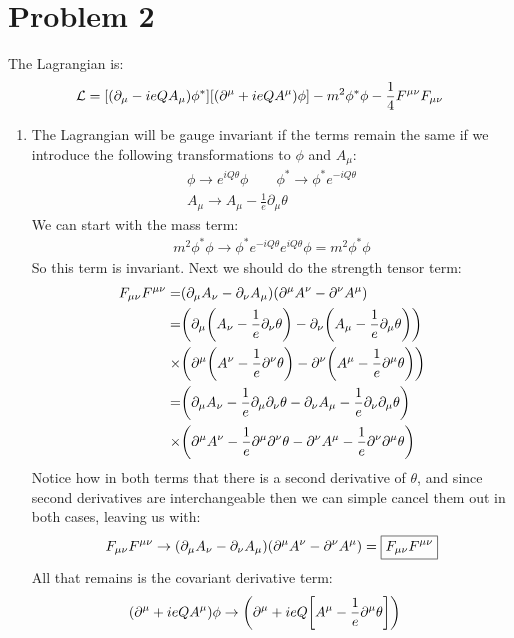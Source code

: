 \documentclass[12pt]{article}
\renewcommand{\L}{\mathcal{L}}
\newcommand{\D}{\partial}
\newcommand{\munu}{{\mu\nu}}
\begin{document}
\section*{Problem 2}
The Lagrangian is:
\begin{align*}
  \L=\qty[(\D_\mu-ieQA_\mu)\phi^*]\qty[(\D^\mu+ieQA^\mu)\phi]
  -m^2\phi^*\phi-\frac{1}{4}F^\munu F_\munu
\end{align*}
\begin{enumerate}[label=\alph*)]
\item The Lagrangian will be gauge invariant if the terms remain the same if we introduce the following transformations to $\phi$ and $A_\mu$:
  \begin{gather*}
    \phi\to e^{iQ\theta}\phi\qquad\phi^*\to \phi^*e^{-iQ\theta} \\
    A_\mu\to A_\mu-\frac{1}{e}\D_\mu\theta
  \end{gather*}
  We can start with the mass term:
  \begin{align*}
    m^2\phi^*\phi\to\phi^*e^{-iQ\theta}e^{iQ\theta}\phi=\boxed{m^2\phi^*\phi}
  \end{align*}
  So this term is invariant. Next we should do the strength tensor term:
  \begin{align*}
    F_{\mu\nu}F^{\mu\nu}=& (\D_\mu A_\nu-\D_\nu A_\mu)(\D^\mu A^\nu-\D^\nu A^\mu)\\
    =& \qty(\D_\mu\qty(A_\nu-\frac{1}{e}\D_\nu\theta)
    -\D_\nu\qty(A_\mu-\frac{1}{e}\D_\mu\theta))\\
    \times& \qty(\D^\mu\qty(A^\nu-\frac{1}{e}\D^\nu\theta)
    -\D^\nu\qty(A^\mu-\frac{1}{e}\D^\mu\theta))\\
    =& \qty(\D_\mu A_\nu-\frac{1}{e}\D_\mu\D_\nu\theta
    -\D_\nu A_\mu-\frac{1}{e}\D_\nu\D_\mu\theta)\\
    \times& \qty(\D^\mu A^\nu-\frac{1}{e}\D^\mu\D^\nu\theta
    -\D^\nu A^\mu-\frac{1}{e}\D^\nu\D^\mu\theta)
  \end{align*}
  Notice how in both terms that there is a second derivative of $\theta$, and since second derivatives are interchangeable then we can simple cancel them out in both cases, leaving us with:
  \begin{align*}
    F_{\mu\nu}F^{\mu\nu}\to\qty(\D_\mu A_\nu-\D_\nu A_\mu)
    \qty(\D^\mu A^\nu-\D^\nu A^\mu)=\boxed{F_{\mu\nu}F^{\mu\nu}}
  \end{align*}
  All that remains is the covariant derivative term:
  \begin{align*}
    (\D^\mu+ieQA^\mu)\phi&\to\qty(\D^\mu+ieQ\qty[A^\mu-\frac{1}{e}\D^\mu\theta])

\end{align*}
\end{enumerate}
\end{document}
